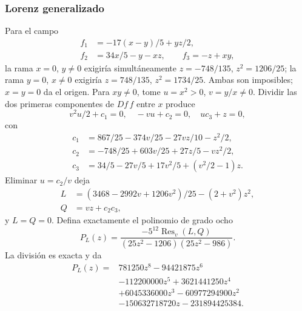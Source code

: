 \subsubsection{Lorenz generalizado}
Para el campo
\begin{equation}
 \begin{aligned}
 f_1&=-17(x-y)/5+yz/2,\\
 f_2&=34x/5-y-xz,\qquad f_3=-z+xy,
 \end{aligned}
 \label{bre:geo:lorenz}
\end{equation}
la rama $x=0$, $y\ne0$ exigiría simultáneamente
$z=-748/135$, $z^2=1206/25$; la rama $y=0$, $x\ne0$ exigiría
$z=748/135$, $z^2=1734/25$. Ambas son imposibles; $x=y=0$ da el
origen. Para $xy\ne0$, tome $u=x^2>0$, $v=y/x\ne0$. Dividir las
dos primeras componentes de $Df\,f$ entre $x$ produce
\begin{equation}
 v^2u/2+c_1=0,\quad -vu+c_2=0,\quad uc_3+z=0,
 \label{bre:geo:lorenz-reduced}
\end{equation}
con
\begin{equation}
 \begin{aligned}
 c_1&=867/25-374v/25-27vz/10-z^2/2,\\
 c_2&=-748/25+603v/25+27z/5-vz^2/2,\\
 c_3&=34/5-27v/5+17v^2/5+(v^2/2-1)z.
 \end{aligned}
 \label{bre:geo:lorenz-c}
\end{equation}
Eliminar $u=c_2/v$ deja
\begin{equation}
 \begin{aligned}
 L&=(3468-2992v+1206v^2)/25-(2+v^2)z^2,\\
 Q&=vz+c_2c_3,
 \end{aligned}
 \label{bre:geo:lorenz-LQ}
\end{equation}
y $L=Q=0$. Defina exactamente el polinomio de grado ocho
\begin{equation}
 P_L(z)=\frac{-5^{12}\operatorname{Res}_v(L,Q)}
 {(25z^2-1206)(25z^2-986)}.
 \label{bre:geo:lorenz-eliminant}
\end{equation}
La división es exacta y da
\begin{equation}
 \begin{aligned}
 P_L(z)={}&781250z^8-94421875z^6\\
 &-112200000z^5+3621441250z^4\\
 &+6045336000z^3-60977294900z^2\\
 &-150632718720z-231894425384.
 \end{aligned}
 \label{bre:geo:lorenz-polynomial}
\end{equation}

